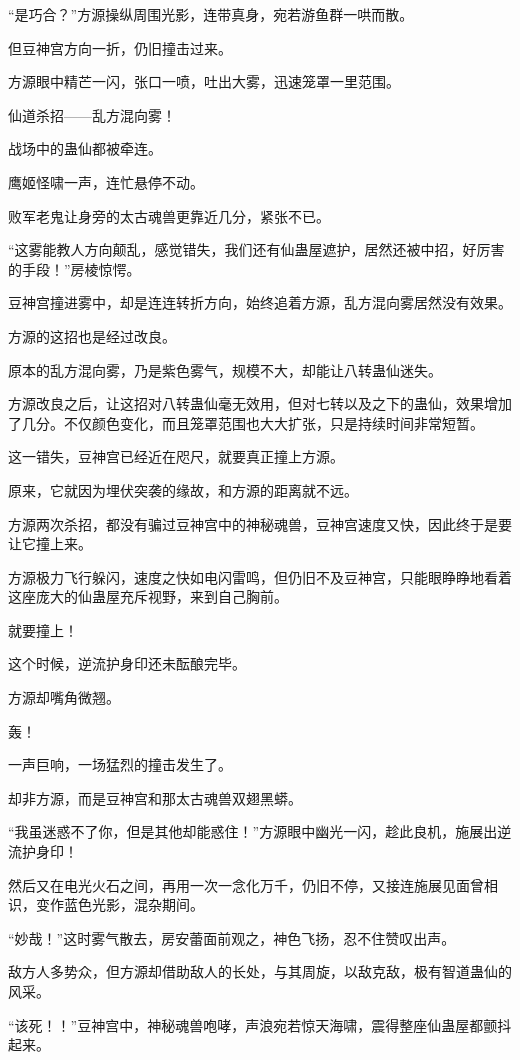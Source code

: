 \begin{this_body}
“是巧合？”方源操纵周围光影，连带真身，宛若游鱼群一哄而散。

但豆神宫方向一折，仍旧撞击过来。

方源眼中精芒一闪，张口一喷，吐出大雾，迅速笼罩一里范围。

仙道杀招——乱方混向雾！

战场中的蛊仙都被牵连。

鹰姬怪啸一声，连忙悬停不动。

败军老鬼让身旁的太古魂兽更靠近几分，紧张不已。

“这雾能教人方向颠乱，感觉错失，我们还有仙蛊屋遮护，居然还被中招，好厉害的手段！”房棱惊愕。

豆神宫撞进雾中，却是连连转折方向，始终追着方源，乱方混向雾居然没有效果。

方源的这招也是经过改良。

原本的乱方混向雾，乃是紫色雾气，规模不大，却能让八转蛊仙迷失。

方源改良之后，让这招对八转蛊仙毫无效用，但对七转以及之下的蛊仙，效果增加了几分。不仅颜色变化，而且笼罩范围也大大扩张，只是持续时间非常短暂。

这一错失，豆神宫已经近在咫尺，就要真正撞上方源。

原来，它就因为埋伏突袭的缘故，和方源的距离就不远。

方源两次杀招，都没有骗过豆神宫中的神秘魂兽，豆神宫速度又快，因此终于是要让它撞上来。

方源极力飞行躲闪，速度之快如电闪雷鸣，但仍旧不及豆神宫，只能眼睁睁地看着这座庞大的仙蛊屋充斥视野，来到自己胸前。

就要撞上！

这个时候，逆流护身印还未酝酿完毕。

方源却嘴角微翘。

轰！

一声巨响，一场猛烈的撞击发生了。

却非方源，而是豆神宫和那太古魂兽双翅黑蟒。

“我虽迷惑不了你，但是其他却能惑住！”方源眼中幽光一闪，趁此良机，施展出逆流护身印！

然后又在电光火石之间，再用一次一念化万千，仍旧不停，又接连施展见面曾相识，变作蓝色光影，混杂期间。

“妙哉！”这时雾气散去，房安蕾面前观之，神色飞扬，忍不住赞叹出声。

敌方人多势众，但方源却借助敌人的长处，与其周旋，以敌克敌，极有智道蛊仙的风采。

“该死！！”豆神宫中，神秘魂兽咆哮，声浪宛若惊天海啸，震得整座仙蛊屋都颤抖起来。


\end{this_body}
